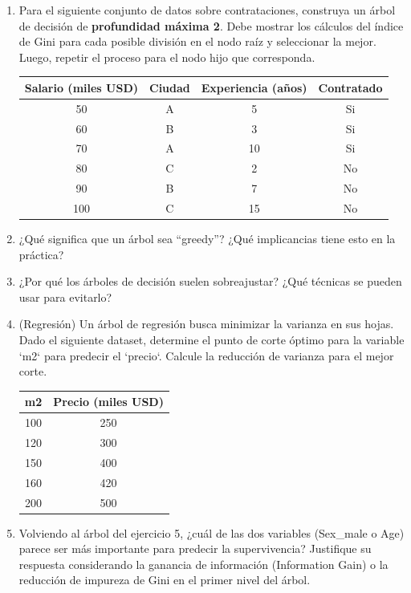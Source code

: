 \documentclass[12pt]{article}
\begin{document}
\begin{enumerate}
  \item Para el siguiente conjunto de datos sobre contrataciones, construya un árbol de decisión de \textbf{profundidad máxima 2}. Debe mostrar los cálculos del índice de Gini para cada posible división en el nodo raíz y seleccionar la mejor. Luego, repetir el proceso para el nodo hijo que corresponda.
    \begin{center}
    \begin{tabular}{cccc}
    \toprule
    Salario (miles USD) & Ciudad & Experiencia (años) & Contratado \\
    \midrule
    50 & A & 5 & Si \\
    60 & B & 3 & Si \\
    70 & A & 10 & Si \\
    80 & C & 2 & No \\
    90 & B & 7 & No \\
    100 & C & 15 & No \\
    \bottomrule
    \end{tabular}
    \end{center}

  \item ¿Qué significa que un árbol sea ``greedy''? ¿Qué implicancias tiene esto en la práctica?

  \item ¿Por qué los árboles de decisión suelen sobreajustar? ¿Qué técnicas se pueden usar para evitarlo?
  
  \item (Regresión) Un árbol de regresión busca minimizar la varianza en sus hojas. Dado el siguiente dataset, determine el punto de corte óptimo para la variable `m2` para predecir el `precio`. Calcule la reducción de varianza para el mejor corte.
    \begin{center}
    \begin{tabular}{cc}
    \toprule
    m2 & Precio (miles USD) \\
    \midrule
    100 & 250 \\
    120 & 300 \\
    150 & 400 \\
    160 & 420 \\
    200 & 500 \\
    \bottomrule
    \end{tabular}
    \end{center}

  \item Volviendo al árbol del ejercicio 5, ¿cuál de las dos variables (Sex\_male o Age) parece ser más importante para predecir la supervivencia? Justifique su respuesta considerando la ganancia de información (Information Gain) o la reducción de impureza de Gini en el primer nivel del árbol.


\end{enumerate}
\end{document}
